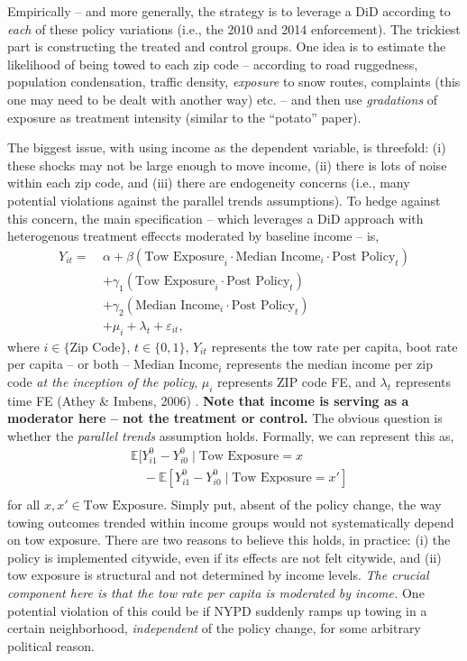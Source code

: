 \documentclass[12pt,letterpaper,doublespace, oneside]{article}
\begin{document}
Empirically -- and more generally, the strategy is to leverage a DiD according to \emph{each} of these policy variations (i.e., the 2010 and 2014 enforcement). The trickiest part is constructing the treated and control groups. One idea is to estimate the likelihood of being towed to each zip code -- according to road ruggedness, population condensation, traffic density, \emph{exposure} to snow routes, complaints (this one may need to be dealt with another way) etc. -- and then use \emph{gradations} of exposure as treatment intensity (similar to the \enquote{potato} paper). 

The biggest issue, with using income as the dependent variable, is threefold: (i) these shocks may not be large enough to move income, (ii) there is lots of noise within each zip code, and (iii) there are endogeneity concerns (i.e., many potential violations against the parallel trends assumptions). To hedge against this concern, the main specification -- which leverages a DiD approach with heterogenous treatment effeccts moderated by baseline income -- is,
\begin{align}
Y_{it} = \ & \alpha 
+ \beta(\text{Tow Exposure}_i \cdot \text{Median Income}_i \cdot \text{Post Policy}_t) \nonumber \\
& + \gamma_1(\text{Tow Exposure}_i \cdot \text{Post Policy}_t) \nonumber \\
& + \gamma_2(\text{Median Income}_i \cdot \text{Post Policy}_t) \nonumber \\
& + \mu_i + \lambda_t + \varepsilon_{it},
\end{align}
where $i \in \{\text{Zip Code}\}$, $t \in \{0,1\}$, $Y_{it}$ represents the tow rate per capita, boot rate per capita -- or both -- $\text{Median Income}_i$ represents the median income per zip code \emph{at the inception of the policy}, $\mu_i$ represents ZIP code FE, and $\lambda_t$ represents time FE (Athey \& Imbens, 2006) \cite{Athey}. \textbf{Note that income is serving as a moderator here -- not the treatment or control.} The obvious question is whether the \emph{parallel trends} assumption holds. Formally, we can represent this as,
\begin{align}
& \mathbb{E}[Y_{i1}^0-Y_{i0}^0 \mid \text{Tow Exposure} = x \nonumber \\
& \quad - \mathbb{E}[Y_{i1}^0-Y_{i0}^0 \mid \text{Tow Exposure} = x'] \nonumber \\
\end{align}
for all $x,x' \in \text{Tow Exposure}$. Simply put, absent of the policy change, the way towing outcomes trended within income groups would not systematically depend on tow exposure. There are two reasons to believe this holds, in practice: (i) the policy is implemented citywide, even if its effects are not felt citywide, and (ii) tow exposure is structural and not determined by income levels. \emph{The crucial component here is that the tow rate per capita is moderated by income.} One potential violation of this could be if NYPD suddenly ramps up towing in a certain neighborhood, \emph{independent} of the policy change, for some arbitrary political reason. 
\end{document}
